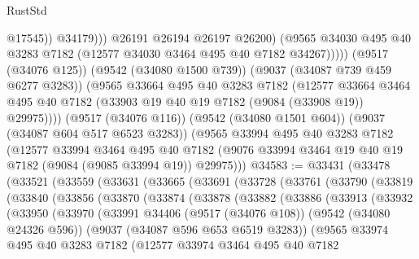 \begin{lexlean}{RustStd}
\begin{coremodule}
                        @17545))
                    @34179)))
              @26191
              @26194
              @26197
              @26200)
            (@9565 @34030 @495 @40 @3283 @7182 (@12577 @34030 @3464 @495 @40 @7182 @34267)))))
      (@9517 (@34076 @125))
      (@9542 (@34080 @1500 @739))
      (@9037 (@34087 @739 @459 @6277 @3283))
      (@9565
        @33664
        @495
        @40
        @3283
        @7182
        (@12577
          @33664
          @3464
          @495
          @40
          @7182
          (@33903 @19 @40 @19 @7182 (@9084 (@33908 @19)) @29975))))
    (@9517 (@34076 @116))
    (@9542 (@34080 @1501 @604))
    (@9037 (@34087 @604 @517 @6523 @3283))
    (@9565
      @33994
      @495
      @40
      @3283
      @7182
      (@12577
        @33994
        @3464
        @495
        @40
        @7182
        (@9076 @33994 @3464 @19 @40 @19 @7182 (@9084 (@9085 @33994 @19)) @29975)))
@34583 := @33431
    (@33478
      (@33521
        (@33559
          (@33631
            (@33665
              (@33691
                (@33728
                  (@33761
                    (@33790
                      (@33819
                        (@33840
                          (@33856
                            (@33870
                              (@33874
                                (@33878
                                  (@33882
                                    (@33886
                                      (@33913
                                        (@33932
                                          (@33950
                                            (@33970
                                              (@33991
                                                @34406
                                                (@9517 (@34076 @108))
                                                (@9542 (@34080 @24326 @596))
                                                (@9037 (@34087 @596 @653 @6519 @3283))
                                                (@9565
                                                  @33974
                                                  @495
                                                  @40
                                                  @3283
                                                  @7182
                                                  (@12577
                                                    @33974
                                                    @3464
                                                    @495
                                                    @40
                                                    @7182

\end{coremodule}
\end{lexlean}

